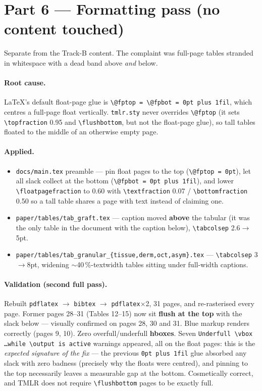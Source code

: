 \documentclass[11pt,a4paper]{article}
\begin{document}
\section*{Part 6 --- Formatting pass (no content touched)}

Separate from the Track-B content. The complaint was full-page tables stranded in whitespace with a
dead band above \emph{and} below.

\paragraph{Root cause.} \LaTeX's default float-page glue is
\verb|\@fptop = \@fpbot = 0pt plus 1fil|, which centres a full-page float vertically.
\texttt{tmlr.sty} never overrides \verb|\@fptop| (it sets \verb|\topfraction| 0.95 and
\verb|\flushbottom|, but not the float-page glue), so tall tables floated to the middle of an
otherwise empty page.

\paragraph{Applied.}
\begin{itemize}
\item \texttt{docs/main.tex} preamble --- pin float pages to the top (\verb|\@fptop = 0pt|), let all
      slack collect at the bottom (\verb|\@fpbot = 0pt plus 1fil|), and lower
      \verb|\floatpagefraction| to 0.60 with \verb|\textfraction| 0.07 / \verb|\bottomfraction| 0.50
      so a tall table shares a page with text instead of claiming one.
\item \texttt{paper/tables/tab\_graft.tex} --- caption moved \textbf{above} the tabular (it was the
      only table in the document with the caption below), \verb|\tabcolsep| 2.6$\rightarrow$5pt.
\item \texttt{paper/tables/tab\_granular\_\{tissue,derm,oct,asym\}.tex} --- \verb|\tabcolsep|
      3$\rightarrow$8pt, widening $\sim$40\,\%-textwidth tables sitting under full-width captions.
\end{itemize}

\paragraph{Validation (second full pass).} Rebuilt \texttt{pdflatex} $\rightarrow$ \texttt{bibtex}
$\rightarrow$ \texttt{pdflatex}$\times$2, 31 pages, and re-rasterised every page. Former pages
28--31 (Tables 12--15) now sit \textbf{flush at the top} with the slack below --- visually confirmed
on pages 28, 30 and 31. Blue markup renders correctly (pages 9, 10). Zero overfull/underfull
\textbf{hboxes}. Seven \texttt{Underfull \textbackslash vbox \dots while \textbackslash output is
active} warnings appeared, all on the float pages: this is the \emph{expected signature of the fix}
--- the previous \verb|0pt plus 1fil| glue absorbed any slack with zero badness (precisely why the
floats were centred), and pinning to the top necessarily leaves a measurable gap at the bottom.
Cosmetically correct, and TMLR does not require \verb|\flushbottom| pages to be exactly full.
\end{document}
